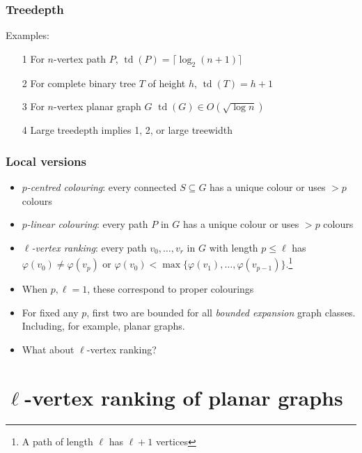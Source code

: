 \documentclass[xcolor=dvipsnames]{beamer}
\DeclareMathOperator{\td}{td}
\begin{document}
\begin{frame}
  \frametitle{Treedepth}

  Examples:
  \begin{enumerate}[<+->]
    \item[1] For $n$-vertex path $P$, $\td(P)=\lceil \log_2 (n+1)\rceil$
    \item[2] For complete binary tree $T$ of height $h$, $\td(T)=h+1$
    \item[3] For $n$-vertex planar graph $G$ $\td(G)\in O(\sqrt{\log n})$
    \item[4] Large treedepth implies 1, 2, or large treewidth
  \end{enumerate}
\end{frame}


\begin{frame}
  \frametitle{Local versions}

  \begin{itemize}
    \item \emph{$p$-centred colouring}: every connected $S\subseteq G$ has a unique colour or uses $>\!\!p$ colours

    \item \emph{$p$-linear colouring}: every path $P$ in $G$ has a unique colour or uses $>\!\!p$ colours

    \item \emph{$\ell$-vertex ranking}: every path $v_0,\ldots,v_r$ in $G$ with length $p\le\ell$ has $\varphi(v_0)\neq\varphi(v_p)$ or $\varphi(v_0)<\max\{\varphi(v_1),\ldots,\varphi(v_{p-1})\}$.\footnote{A path of length $\ell$ has $\ell+1$ vertices}

    \item<2-> When $p,\ell=1$, these correspond to proper colourings

    \item<3-> For fixed any $p$, first two are bounded for all \emph{bounded expansion} graph classes. Including, for example, planar graphs.

    \item<4-> What about $\ell$-vertex ranking?
  \end{itemize}
\end{frame}


\section{$\ell$-vertex ranking of planar graphs}
\end{document}
